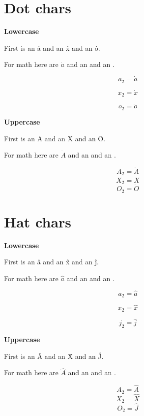 \documentclass{article}
\begin{document}
\section{Dot chars}
\textbf{Lowercase}

First is an \.{a} and an \.{x} and an \.{o}.

For math here are $\dot{a}$ and an  and an .

$$a_2=\dot{a}$$

$$x_2=\dot{x}$$

$$o_2=\dot{o}$$

\textbf{Uppercase}

First is an \.{A} and an \.{X} and an \.{O}.

For math here are $\dot{A}$ and an  and an .

$$A_2=\dot{A}$$
$$X_2=\dot{X}$$
$$O_2=\dot{O}$$


\section{Hat chars}
\textbf{Lowercase}

First is an \^{a} and an \^{x} and an \^{j}.

For math here are $\hat{a}$ and an  and an .

$$a_2=\hat{a}$$

$$x_2=\hat{x}$$

$$j_2=\hat{j}$$

\textbf{Uppercase}

First is an \^{A} and an \^{X} and an \^{J}.

For math here are $\hat{A}$ and an  and an .

$$A_2=\hat{A}$$
$$X_2=\hat{X}$$
$$O_2=\hat{J}$$
\end{document}
